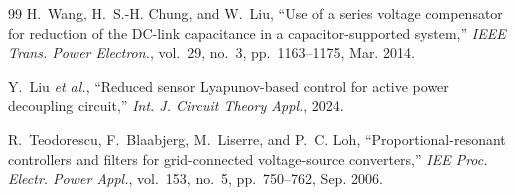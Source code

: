 \documentclass[11pt,a4paper]{article}
\begin{document}
\begin{thebibliography}{99}
H.~Wang, H.~S.-H. Chung, and W.~Liu, ``Use of a series voltage compensator for
reduction of the DC-link capacitance in a capacitor-supported system,''
\emph{IEEE Trans. Power Electron.}, vol.~29, no.~3, pp.~1163--1175, Mar. 2014.

Y.~Liu \emph{et al.}, ``Reduced sensor Lyapunov-based control for active power
decoupling circuit,'' \emph{Int. J. Circuit Theory Appl.}, 2024.

R.~Teodorescu, F.~Blaabjerg, M.~Liserre, and P.~C. Loh,
``Proportional-resonant controllers and filters for grid-connected
voltage-source converters,'' \emph{IEE Proc. Electr. Power Appl.}, vol.~153,
no.~5, pp.~750--762, Sep. 2006.

\end{thebibliography}
\end{document}
